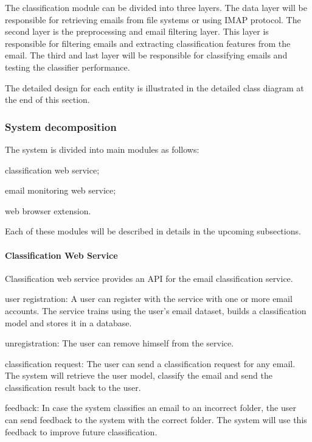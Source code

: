 The classification module can be divided into three layers. The data layer will be 
responsible for retrieving emails from file systems or using IMAP protocol. The 
second layer is the preprocessing and email filtering layer. This layer is 
responsible for filtering emails and extracting classification features from the 
email. The third and last layer will be responsible for classifying emails and 
testing the classifier performance.

The detailed design for each entity is illustrated in the detailed class 
diagram at the end of this section.

\subsubsection{System decomposition}
The system is divided into main modules as follows:
\begin{my_itemize}
  \item classification web service;
  \item email monitoring web service;
  \item web browser extension.
\end{my_itemize}
Each of these modules will be described in details in the upcoming subsections.

\paragraph{Classification Web Service}

Classification web service provides an API for the email classification service.
\begin{my_itemize}
	\item user registration: A user can register with the service with one or more email accounts. The service trains using the user's email dataset, builds a classification model and stores it in a database.
	
	\item unregistration: The user can remove himself from the service.

	\item classification request: The user can send a classification request for any email. The system will retrieve the user model, classify the email and send the classification result back to the user.

	\item feedback: In case the system classifies an email to an incorrect folder, the user can send feedback to the system with the correct folder. The system will use this feedback to improve future classification.

\end{my_itemize}

